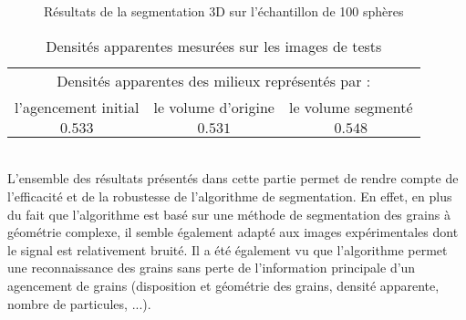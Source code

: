\begin{figure}\centering
	\hspace{5em}
	\\
	\\
	\caption{\label{fig05:3D_spheres_segmentation}Résultats de la segmentation 3D sur l'échantillon de 100 sphères}
\end{figure}
\begin{table}\centering
	\begin{tabular}{c@{  \textbullet\  }c@{  \textbullet\  }c}
		\hline
		\multicolumn{3}{c}{Densités apparentes des milieux représentés par :}\\
		l'agencement initial & le volume d'origine & le volume segmenté \\\hline
		$0.533$ & $0.531$ & $0.548$\\\hline
	\end{tabular}
	\caption{\label{tab05:d_bulk_benchmark}Densités apparentes mesurées sur les images de tests}
\end{table}
\\L'ensemble des résultats présentés dans cette partie permet de rendre compte de l'efficacité et de la robustesse de l'algorithme de segmentation. En effet, en plus du fait que l'algorithme est basé sur une méthode de segmentation des grains à géométrie complexe, il semble également adapté aux images expérimentales dont le signal est relativement bruité. Il a été également vu que l'algorithme permet une reconnaissance des grains sans perte de l'information principale d'un agencement de grains (disposition et géométrie des grains, densité apparente, nombre de particules, ...).